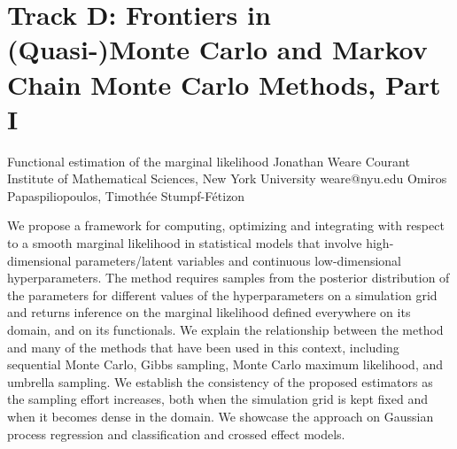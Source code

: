 \section{Track D: Frontiers in (Quasi-)Monte Carlo and Markov Chain Monte Carlo Methods, Part I}\newpage

\begin{talk}
  {Functional estimation of the marginal likelihood}%
  {Jonathan Weare}%
  {Courant Institute of Mathematical Sciences, New York University}%
  {weare@nyu.edu}%
  {Omiros Papaspiliopoulos, Timoth\'ee Stumpf-F\'etizon}%
  
    
   
We propose a framework for computing, optimizing and integrating with respect to
a smooth marginal likelihood in statistical models that involve high-dimensional parameters/latent
variables and continuous low-dimensional hyperparameters. The method requires samples from
the posterior distribution of the parameters for different values of the hyperparameters on a simulation grid and returns inference on the marginal likelihood defined everywhere on its domain,
and on its functionals. We explain the relationship between the method and many of the methods that have been
used in this context, including sequential Monte Carlo, Gibbs sampling, Monte Carlo maximum
likelihood, and umbrella sampling. We establish the consistency of the proposed estimators as
the sampling effort increases, both when the simulation grid is kept fixed and when it becomes
dense in the domain. We showcase the approach on Gaussian process regression and classification and crossed effect models.


\end{talk}

